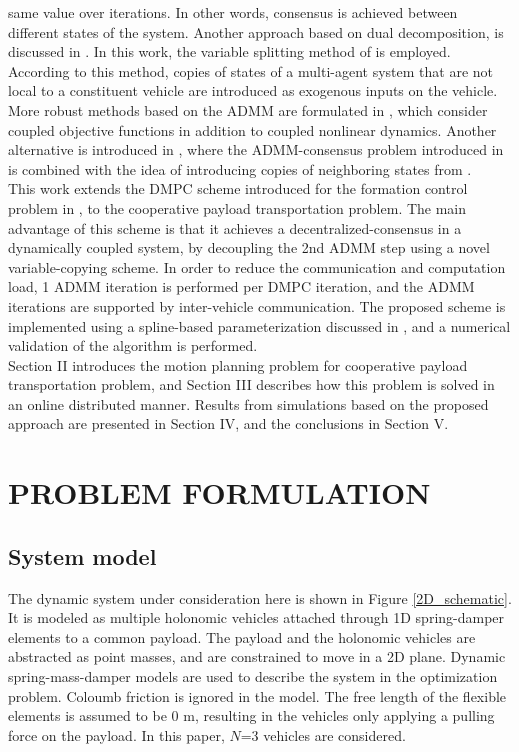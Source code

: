 \documentclass[letterpaper, 10 pt, conference]{ieeeconf}
\begin{document}
 same value over iterations. In other words, consensus is achieved between different states of the system. Another approach based on dual decomposition, is discussed in \cite{c11}. In this work, the variable splitting method of \cite{c8} is employed. According to this method, copies of states of a multi-agent system that are not local to a constituent vehicle are introduced as exogenous inputs on the vehicle. More robust methods based on the ADMM are formulated in \cite{c12}, which consider coupled objective functions in addition to coupled nonlinear dynamics. Another alternative is introduced in \cite{c13}, where the
 ADMM-consensus problem introduced in \cite{c14} is combined with the idea of introducing copies of neighboring states from \cite{c11}.
 \\
 \indent
 This work extends the DMPC scheme introduced for the formation control problem in \cite{c16}, to the cooperative payload transportation problem. The main advantage of this scheme is that it achieves a decentralized-consensus in a dynamically coupled system, by decoupling the 2nd ADMM step using a novel variable-copying scheme. In order to reduce the communication and computation load, 1 ADMM iteration is performed per DMPC iteration, and the ADMM iterations are supported by inter-vehicle communication. The proposed scheme is implemented using a spline-based parameterization discussed in \cite{c16}, and a numerical validation of the algorithm is performed.
\\ \indent
Section  II  introduces  the  motion  planning  problem  for
cooperative payload transportation problem, and Section III describes how
this  problem is solved in an online distributed manner. Results from simulations based on the proposed approach are presented in Section IV, and the conclusions in Section V.
\section{PROBLEM FORMULATION}
\subsection{System model}
The dynamic system under consideration here is shown in Figure \ref{2D_schematic}. It is modeled as multiple holonomic vehicles attached through 1D spring-damper elements to a common payload. The payload and the holonomic vehicles are abstracted as point masses, and are constrained to move in a 2D plane. Dynamic spring-mass-damper models are used to describe the system in the optimization problem. Coloumb friction is ignored in the model. The free length of the flexible elements is assumed to be $0$ m, resulting in the vehicles only applying a pulling force on the payload. In this paper, $N$=3 vehicles are considered.
\end{document}
